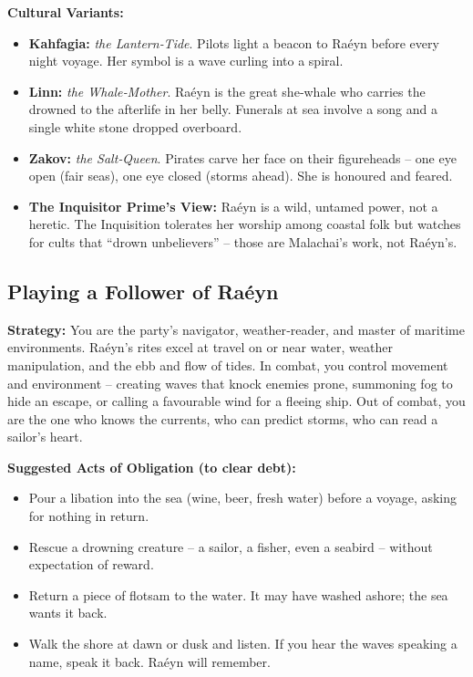 \documentclass[10pt,a5paper]{book}
\begin{document}
\textbf{Cultural Variants:}
\begin{itemize}
    \item \textbf{Kahfagia:} \textit{the Lantern‑Tide}. Pilots light a beacon to Raéyn before every night voyage. Her symbol is a wave curling into a spiral.
    \item \textbf{Linn:} \textit{the Whale‑Mother}. Raéyn is the great she‑whale who carries the drowned to the afterlife in her belly. Funerals at sea involve a song and a single white stone dropped overboard.
    \item \textbf{Zakov:} \textit{the Salt‑Queen}. Pirates carve her face on their figureheads – one eye open (fair seas), one eye closed (storms ahead). She is honoured and feared.
    \item \textbf{The Inquisitor Prime’s View:} Raéyn is a wild, untamed power, not a heretic. The Inquisition tolerates her worship among coastal folk but watches for cults that “drown unbelievers” – those are Malachai’s work, not Raéyn’s.
\end{itemize}

\subsection*{Playing a Follower of Raéyn}

\textbf{Strategy:} You are the party’s navigator, weather‑reader, and master of maritime environments. Raéyn’s rites excel at travel on or near water, weather manipulation, and the ebb and flow of tides. In combat, you control movement and environment – creating waves that knock enemies prone, summoning fog to hide an escape, or calling a favourable wind for a fleeing ship. Out of combat, you are the one who knows the currents, who can predict storms, who can read a sailor’s heart.

\textbf{Suggested Acts of Obligation (to clear debt):}
\begin{itemize}
    \item Pour a libation into the sea (wine, beer, fresh water) before a voyage, asking for nothing in return.
    \item Rescue a drowning creature – a sailor, a fisher, even a seabird – without expectation of reward.
    \item Return a piece of flotsam to the water. It may have washed ashore; the sea wants it back.
    \item Walk the shore at dawn or dusk and listen. If you hear the waves speaking a name, speak it back. Raéyn will remember.
\end{itemize}
\end{document}
